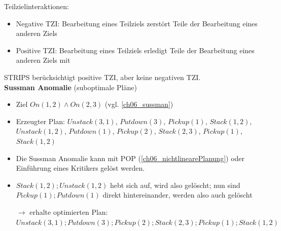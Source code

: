 Teilzielinteraktionen:
\begin{itemize}
	\item Negative TZI: Bearbeitung eines Teilziels zerstört Teile der Bearbeitung eines anderen Ziels
	\item Positive TZI: Bearbeitung eines Teilziels erledigt Teile der Bearbeitung eines anderen Ziels mit
\end{itemize}
STRIPS berücksichtigt positive TZI, aber keine negativen TZI.\\

\textbf{Sussman Anomalie} (suboptimale Pläne)
\begin{itemize}
	\item Ziel $On(1,2) \wedge On(2,3)$ (vgl. \autoref{ch06_sussman})
	\item Erzeugter Plan: $Unstack(3,1)$, $Putdown(3)$, $Pickup(1)$, $Stack(1,2)$, $Unstack(1,2)$, $Putdown(1)$, $Pickup(2)$, $Stack(2,3)$, $Pickup(1)$, $Stack(1,2)$
	\item Die Sussman Anomalie kann mit POP (\autoref{ch06_nichtlinearePlanung}) oder Einführung eines Kritikers gelöst werden.
	\item $Stack(1,2); Unstack(1,2)$ hebt sich auf, wird also gelöscht; nun sind $Pickup(1); Putdown(1)$ direkt hintereinander, werden also auch gelöscht
	\item[$\rightarrow$] erhalte optimierten Plan: $Unstack(3,1); Putdown(3); Pickup(2); Stack(2,3); Pickup(1); Stack(1,2)$
\end{itemize}

